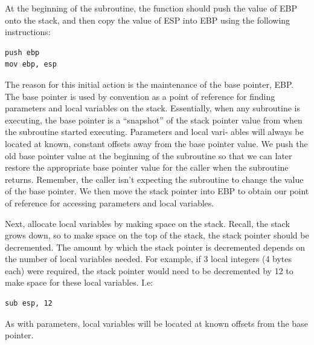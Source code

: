 \begin{numlist}

\item At the beginning of the subroutine, the function should push the
  value of EBP onto the stack, and then copy the value of ESP into EBP
  using the following instructions:

\begin{lstlisting}[backgroundcolor=\color{white},frame=trBL,linewidth=3.75in,xleftmargin=2.25in,label={x86-callee-code-1.lst},language={[x86masm]Assembler},caption={x86 callee code, part 1}]
push ebp
mov ebp, esp
\end{lstlisting}

The reason for this initial action is the maintenance of the base
pointer, EBP. The base pointer is used by convention as a point of
reference for finding parameters and local variables on the stack.
Essentially, when any subroutine is executing, the base pointer is a
``snapshot'' of the stack pointer value from when the subroutine
started executing. Parameters and local vari- ables will always be
located at known, constant offsets away from the base pointer value.
We push the old base pointer value at the beginning of the subroutine
so that we can later restore the appropriate base pointer value for
the caller when the subroutine returns. Remember, the caller isn't
expecting the subroutine to change the value of the base pointer. We
then move the stack pointer into EBP to obtain our point of reference
for accessing parameters and local variables.

\item Next, allocate local variables by making space on the stack.
  Recall, the stack grows down, so to make space on the top of the
  stack, the stack pointer should be decremented. The amount by which
  the stack pointer is decremented depends on the number of local
  variables needed. For example, if 3 local integers (4 bytes each)
  were required, the stack pointer would need to be decremented by 12
  to make space for these local variables. I.e:

\begin{lstlisting}[backgroundcolor=\color{white},frame=trBL,linewidth=3.75in,xleftmargin=2.25in,label={x86-callee-code-2.lst},language={[x86masm]Assembler},caption={x86 callee code, part 2}]
sub esp, 12
\end{lstlisting}

As with parameters, local variables will be located at known offsets
from the base pointer.


\end{numlist}
